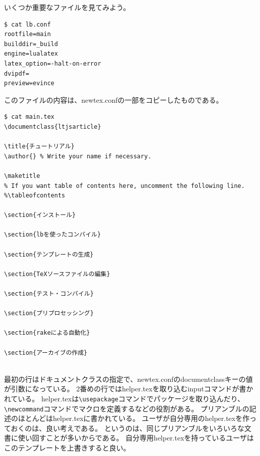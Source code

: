 いくつか重要なファイルを見てみよう。
\begin{verbatim}
$ cat lb.conf
rootfile=main
builddir=_build
engine=lualatex
latex_option=-halt-on-error
dvipdf=
preview=evince
\end{verbatim}
このファイルの内容は、newtex.confの一部をコピーしたものである。
\begin{verbatim}
$ cat main.tex
\documentclass{ltjsarticle}

\title{チュートリアル}
\author{} % Write your name if necessary.

\maketitle
% If you want table of contents here, uncomment the following line.
%\tableofcontents

\section{インストール}
  
\section{lbを使ったコンパイル}
  
\section{テンプレートの生成}
  
\section{TeXソースファイルの編集}
  
\section{テスト・コンパイル}
  
\section{プリプロセッシング}
  
\section{rakeによる自動化}
  
\section{アーカイブの作成}
  

\end{verbatim}
最初の行はドキュメントクラスの指定で、newtex.confのdocumentclassキーの値が引数になっている。
2番めの行ではhelper.texを取り込むinputコマンドが書かれている。
helper.texは\verb|\usepackage|コマンドでパッケージを取り込んだり、\verb|\newcommand|コマンドでマクロを定義するなどの役割がある。
プリアンブルの記述のほとんどはhelper.texに書かれている。
ユーザが自分専用のhelper.texを作っておくのは、良い考えである。
というのは、同じプリアンブルをいろいろな文書に使い回すことが多いからである。
自分専用helper.texを持っているユーザはこのテンプレートを上書きすると良い。

